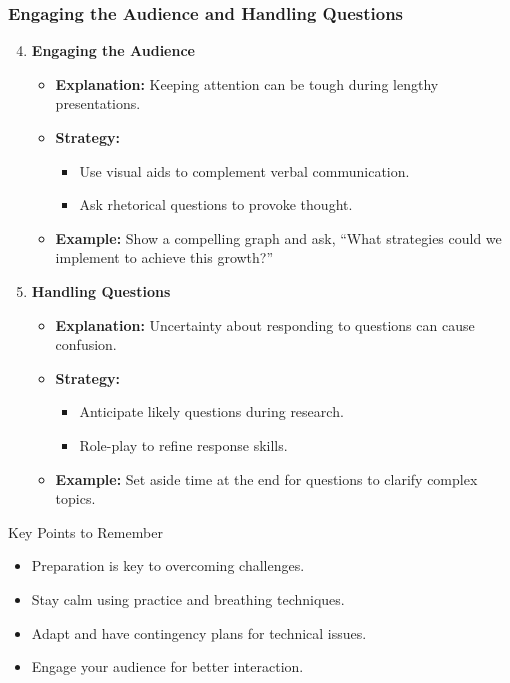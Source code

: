 \documentclass[aspectratio=169]{beamer}
\begin{document}
\begin{frame}[fragile]
    \frametitle{Engaging the Audience and Handling Questions}
    \begin{enumerate}
        \setcounter{enumi}{3} %
        \item \textbf{Engaging the Audience}
            \begin{itemize}
                \item \textbf{Explanation:} Keeping attention can be tough during lengthy presentations.
                \item \textbf{Strategy:}
                    \begin{itemize}
                        \item Use visual aids to complement verbal communication.
                        \item Ask rhetorical questions to provoke thought.
                    \end{itemize}
                \item \textbf{Example:} Show a compelling graph and ask, “What strategies could we implement to achieve this growth?”
            \end{itemize}

        \item \textbf{Handling Questions}
            \begin{itemize}
                \item \textbf{Explanation:} Uncertainty about responding to questions can cause confusion.
                \item \textbf{Strategy:}
                    \begin{itemize}
                        \item Anticipate likely questions during research.
                        \item Role-play to refine response skills.
                    \end{itemize}
                \item \textbf{Example:} Set aside time at the end for questions to clarify complex topics.
            \end{itemize}
    \end{enumerate}

    \begin{block}{Key Points to Remember}
        \begin{itemize}
            \item Preparation is key to overcoming challenges.
            \item Stay calm using practice and breathing techniques.
            \item Adapt and have contingency plans for technical issues.
            \item Engage your audience for better interaction.
        \end{itemize}
    \end{block}


\end{frame}
\end{document}
